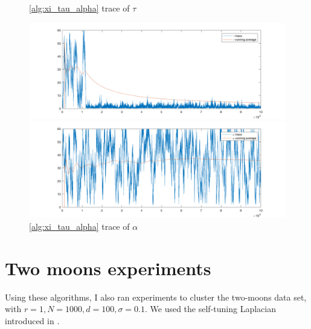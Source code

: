 \documentclass{siamart1116}
\begin{document}
\begin{figure}[!htb]
\begin{minipage}{0.48\textwidth}
    \caption{\label{fig:noncentered_voting_tau}\cref{alg:xi_tau_alpha} trace of $\tau$}
    \includegraphics[width=\linewidth]{voting/noncentered/trace_tau.png}
\end{minipage}\hfill
\begin{minipage}{0.48\textwidth}
    \caption{\label{fig:noncentered_voting_alpha} \cref{alg:xi_tau_alpha} trace of $\alpha$}
    \includegraphics[width=\linewidth]{voting/noncentered/trace_alpha.png}
\end{minipage}
\end{figure}

\section{Two moons experiments}

Using these algorithms, I also ran experiments to cluster the two-moons data set, with $r=1, N = 1000, d = 100, \sigma = 0.1$. We used the self-tuning Laplacian introduced in \cite{SelfTuning}.
\end{document}
